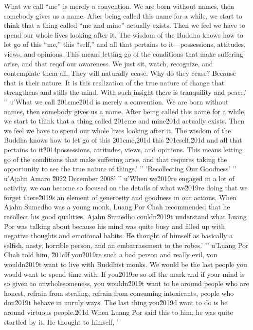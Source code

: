 What we call ``me'' is merely a convention. We are born without names, 
then somebody gives us a name. After being called this name for a 
while, we start to think that a thing called ``me and mine'' actually 
exists. Then we feel we have to spend our whole lives looking after it. 
The wisdom of the Buddha knows how to let go of this ``me,'' this 
``self,'' and all that pertains to it---possessions, attitudes, views, 
and opinions. This means letting go of the conditions that make 
suffering arise, and that reqof our awareness. We just sit, watch, recognize, and contemplate them all. They will naturally cease. Why do they cease? Because that is their nature. It is this realization of the true nature of change that strengthens and stills the mind. With such insight there is tranquility and peace.'
'\n'
u'What we call \u201cme\u201d is merely a convention. We are born without names, then somebody gives us a name. After being called this name for a while, we start to think that a thing called \u201cme and mine\u201d actually exists. Then we feel we have to spend our whole lives looking after it. The wisdom of the Buddha knows how to let go of this \u201cme,\u201d this \u201cself,\u201d and all that pertains to it\u2014possessions, attitudes, views, and opinions. This means letting go of the conditions that make suffering arise, and that requires taking the opportunity to see the true nature of things.'
'\n'
'Recollecting Our Goodness'
'\n'
u'Ajahn Amaro \u2022 December 2008'
'\n'
u'When we\u2019re engaged in a lot of activity, we can become so focused on the details of what we\u2019re doing that we forget there\u2019s an element of generosity and goodness in our actions. When Ajahn Sumedho was a young monk, Luang Por Chah recommended that he recollect his good qualities. Ajahn Sumedho couldn\u2019t understand what Luang Por was talking about because his mind was quite busy and filled up with negative thoughts and emotional habits. He thought of himself as basically a selfish, nasty, horrible person, and an embarrassment to the robes.'
'\n'
u'Luang Por Chah told him, \u201cIf you\u2019re such a bad person and really evil, you wouldn\u2019t want to live with Buddhist monks. We would be the last people you would want to spend time with. If you\u2019re so off the mark and if your mind is so given to unwholesomeness, you wouldn\u2019t want to be around people who are honest, refrain from stealing, refrain from consuming intoxicants, people who don\u2019t behave in unruly ways. The last thing you\u2019d want to do is be around virtuous people.\u201d When Luang Por said this to him, he was quite startled by it. He thought to himself, '
